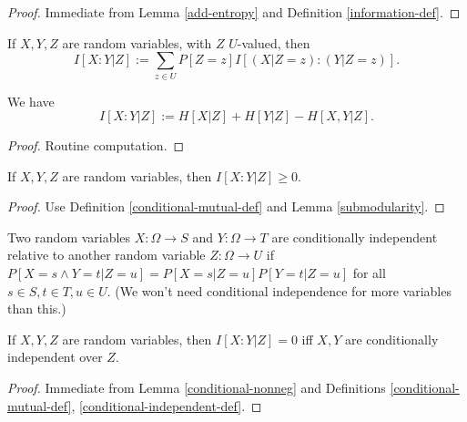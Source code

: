 \begin{proof} \leanok Immediate from Lemma \ref{add-entropy} and Definition \ref{information-def}.
\end{proof}

\begin{definition}
\label{conditional-mutual-def}
\leanok
If $X,Y,Z$ are random variables, with $Z$ $U$-valued, then
$$ I[X:Y|Z] := \sum_{z \in U} P[Z=z] I[(X|Z=z): (Y|Z=z)].$$
\end{definition}

\begin{lemma}
  \label{conditional-mutual-alt}
We have
  $$ I[X:Y|Z] := H[X|Z] + H[Y|Z] - H[X,Y|Z].$$
\end{lemma}

\begin{proof} Routine computation.
\end{proof}

\begin{lemma}
\label{conditional-nonneg}
If $X,Y,Z$ are random variables, then $I[X:Y|Z] \ge 0$.
\end{lemma}
\begin{proof}
\leanok
Use Definition \ref{conditional-mutual-def} and Lemma \ref{submodularity}.
\end{proof}

\begin{definition}
\label{conditional-independent-def}
\leanok
  Two random variables $X: \Omega \to S$ and $Y: \Omega \to T$ are conditionally independent relative to another random variable $Z: \Omega \to U$ if $P[ X = s \wedge Y = t| Z=u] = P[X=s|Z=u] P[Y=t|Z=u]$ for all $s \in S, t \in T, u \in U$.  (We won't need conditional independence for more variables than this.)
\end{definition}

\begin{lemma}\label{conditional-vanish}
  \leanok
  If $X,Y,Z$ are random variables, then $I[X:Y|Z] = 0$ iff $X,Y$ are conditionally independent over $Z$.
\end{lemma}

\begin{proof}  Immediate from Lemma \ref{conditional-nonneg} and Definitions \ref{conditional-mutual-def}, \ref{conditional-independent-def}.
\end{proof}
